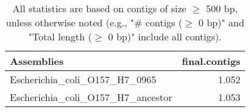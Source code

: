 \documentclass[12pt,a4paper]{article}
\begin{document}
\begin{table}[ht]
\begin{center}
\caption{All statistics are based on contigs of size $\geq$ 500 bp, unless otherwise noted (e.g., "\# contigs ($\geq$ 0 bp)" and "Total length ($\geq$ 0 bp)" include all contigs).}
\begin{tabular}{|l*{1}{|r}|}
\hline
Assemblies & final.contigs \\ \hline
Escherichia\_coli\_O157\_H7\_0965 & 1.052 \\ \hline
Escherichia\_coli\_O157\_H7\_ancestor & 1.053 \\ \hline
\end{tabular}
\end{center}
\end{table}
\end{document}
